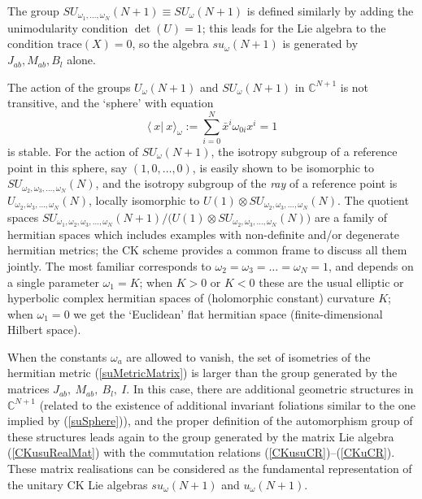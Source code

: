 \documentclass[12pt]{article}
\begin{document}
The group $SU_{{\omega}_1,\dots,{\omega}_N}(N+1)\equiv SU_{\omega}(N+1)$ is
defined similarly by adding the unimodularity condition $\det(U)=1$;
this leads for the Lie algebra to the condition ${\mbox{trace}}(X)
=0$, so the algebra $su_{\omega}(N+1)$ is generated by
${J}_{ab}, {M}_{ab}, {B}_l$ alone.

The action of the groups $U_{\omega}(N+1)$ and $SU_{\omega}(N+1)$ in
${{\mathbb C}}^{N+1}$ is not transitive, and the `sphere' with equation
\begin{equation}
\langle \>x|\>x \rangle_{\omega}:= \sum_{i=0}^N \bar x^i{\omega}_{0i}  x^i =1
\label{suSphere}
\end{equation}
is stable. For the action of
$SU_{\omega}(N+1)$, the isotropy subgroup of a reference point in this
sphere, say $(1, 0, \dots, 0)$, is easily shown to be isomorphic to
$SU_{{\omega}_2,{\omega}_3, \dots, {\omega}_N}(N)$, and the isotropy subgroup of the
\emph{ray} of a reference point is
$U_{{\omega}_2,{\omega}_3, \dots, {\omega}_N}(N)$, locally isomorphic to $U(1) \otimes
SU_{{\omega}_2,{\omega}_3,
\dots, {\omega}_N}(N)$. The quotient spaces
$SU_{{\omega}_1, {\omega}_2, {\omega}_3, \dots, {\omega}_N}(N+1)/\big( U(1) \otimes SU_{{\omega}_2,{\omega}_3,
\dots, {\omega}_N}(N) \big) $ are a family of  hermitian spaces which
includes examples with non-definite and/or
degenerate hermitian metrics; the CK scheme provides a common frame to discuss
all them jointly. The most familiar corresponds to ${\omega}_2={\omega}_3=\dots={\omega}_N=1$,
and depends on a single parameter ${\omega}_1=K$; when $K>0$ or $K<0$ these
are the usual elliptic or hyperbolic complex hermitian spaces of (holomorphic
constant) curvature $K$; when ${\omega}_1=0$ we get
the `Euclidean' flat hermitian space (finite-dimensional Hilbert space).

When the constants ${\omega}_a$ are allowed to vanish, the set of
isometries of the hermitian metric (\ref{suMetricMatrix}) is larger
than the group generated by the matrices
${J}_{ab},\ {M}_{ab},\ {B}_l,\ {I}$. In this case, there are additional
geometric structures in ${{\mathbb C}}^{N+1}$ (related to the existence of
additional invariant foliations similar to the one implied by
(\ref{suSphere})), and the proper definition of the automorphism
group of these structures leads again to the group generated by the
matrix Lie algebra (\ref{CKusuRealMat}) with the commutation relations
 (\ref{CKusuCR})--(\ref{CKuCR}). These matrix
realisations can be considered as the fundamental representation of
the  unitary CK Lie algebras
$su_{\omega}(N+1)$ and $u_{\omega}(N+1)$.
\end{document}
